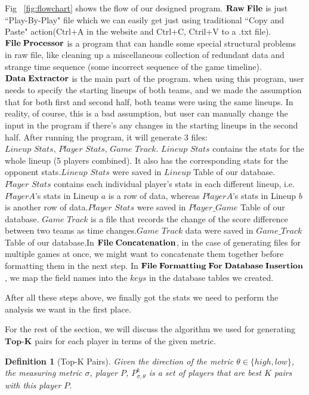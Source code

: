 \documentclass[conference]{IEEEtran}
\newtheorem{definition}{Definition}
\begin{document}
Fig ~\ref{fig:flowchart} shows the flow of our designed program. $\bf{Raw\;File}$ is just ``Play-By-Play" file which we can easily get just using traditional ``Copy and Paste" action(Ctrl+A in the website and Ctrl+C, Ctril+V to a .txt file). $\bf{File\;Processor}$ is a program that can handle some special structural problems in raw file, like cleaning up a miscellaneous collection of redundant data and strange time sequence (some incorrect sequence of the game timeline).$\bf{Data\; Extractor}$ is the main part of the program. when using this program, user needs to specify the starting lineups of both teams, and we made the assumption that for both first and second half, both teams were using the same lineups. In reality, of course, this is a bad assumption, but user can manually change the input in the program if there's any changes in the starting lineups in the second half. After running the program, it will generate 3 files: $\textit{Lineup Stats, Player Stats, Game Track}$. $\textit{Lineup Stats}$ contains the stats for the whole lineup (5 players combined). It also has the corresponding stats for the opponent stats.$\textit{Lineup Stats}$ were saved in $Lineup$ Table of our database.$\textit{Player Stats}$ contains each individual player's stats in each different lineup, i.e. $Player A$'s stats in Lineup $a$ is a row of data, whereas $Player A$'s stats in Lineup $b$ is another row of data.$\textit{Player Stats}$ were saved in $Player\_Game$ Table of our database. $\textit{Game Track}$ is a file that records the change of the score difference between two teams as time changes.$\textit{Game Track}$ data were saved in $Game\_Track$ Table of our database.In $\bf{File\;Concatenation}$, in the case of generating files for multiple games at once, we might want to concatenate them together before formatting them in the next step. In $\bf{File\;Formatting\;For\;Database\;Insertion}$, we map the field names into the $\textit{keys}$ in the database tables we created.

After all these steps above, we finally got the stats we need to perform the analysis we want in the first place.

For the rest of the section, we will discuss the algorithm we used for generating $\textbf{Top-K}$ pairs for each player in terms of the given metric.

\begin{definition}[Top-K Pairs]
Given the direction of the metric $\theta \in \{high,low\}$, the measuring metric $\sigma$, player $P$, $P_{\sigma,\theta}^k$ is a set of players that are best $K$ pairs with this player $P$.
\end{definition}
\end{document}
